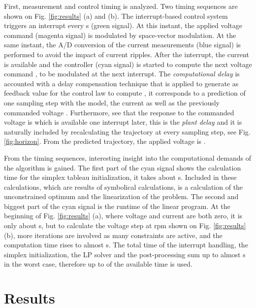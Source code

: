 \documentclass[a4paper,11pt,fleqn]{article}
\begin{document}
First, measurement and control timing is analyzed. Two timing sequences are shown on Fig. \ref{fig:results} (a) and (b). The interrupt-based control system triggers an interrupt every s (green signal). At this instant, the applied voltage command (magenta signal) is modulated by space-vector modulation. At the same instant, the A/D conversion of the current measurements (blue signal) is performed to avoid the impact of current ripples. After the interrupt, the current  is available and the controller (cyan signal) is started to compute the next voltage command , to be modulated at the next interrupt. The \textit{computational delay} is accounted with a delay compensation technique that is applied to generate  as feedback value for the control law to compute  \cite{Moon}, it corresponds to a prediction of one sampling step with the model, the current  as well as the previously commanded voltage . Furthermore, see that the response to the commanded voltage  is  which is available one interrupt later, this is the \textit{plant delay} and it is naturally included by recalculating the trajectory at every sampling step, see Fig. \ref{fig:horizon}. From the predicted trajectory, the applied voltage is .



From the timing sequences, interesting insight into the computational demands of the algorithm is gained. The first part of the cyan signal shows the calculation time for the simplex tableau initialization, it takes about s. Included in these calculations, which are results of symbolical calculations, is a calculation of the unconstrained optimum and the linearization of the problem. The second and biggest part of the cyan signal is the runtime of the linear program. At the beginning of Fig. \ref{fig:results} (a), where voltage and current are both zero, it is only about s, but to calculate the voltage step at  rpm shown on Fig. \ref{fig:results} (b), more iterations are involved as many constraints are active, and the computation time rises to almost s. The total time of the interrupt handling, the simplex initialization, the LP solver and the post-processing sum up to almost s in the worst case, therefore up to  of the available time is used. 









\section*{Results}
\end{document}
